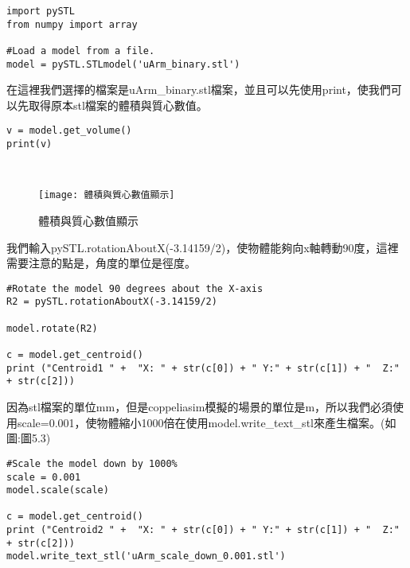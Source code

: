  \begin{lstlisting}[caption=\Large 輸入名稱]
import pySTL
from numpy import array

#Load a model from a file.
model = pySTL.STLmodel('uArm_binary.stl')

\end{lstlisting}

在這裡我們選擇的檔案是uArm\_binary.stl檔案，並且可以先使用print，使我們可以先取得原本stl檔案的體積與質心數值。 \\

 \begin{lstlisting}[caption=\Large 數值]
v = model.get_volume()
print(v)

\end{lstlisting}

\\
\begin{figure}[hbt!]
\begin{center}
\texttt{[image:  體積與質心數值顯示]}
\caption{\Large 體積與質心數值顯示}\label{ 體積與質心數值顯示}
\end{center}
\end{figure}

我們輸入pySTL.rotationAboutX(-3.14159/2)，使物體能夠向x軸轉動90度，這裡需要注意的點是，角度的單位是徑度。\\

 \begin{lstlisting}[caption=\Large 向X軸轉90度]
#Rotate the model 90 degrees about the X-axis
R2 = pySTL.rotationAboutX(-3.14159/2)

model.rotate(R2)

c = model.get_centroid()
print ("Centroid1 " +  "X: " + str(c[0]) + " Y:" + str(c[1]) + "  Z:" + str(c[2]))

\end{lstlisting}

因為stl檔案的單位mm，但是coppeliasim模擬的場景的單位是m，所以我們必須使用scale=0.001，使物體縮小1000倍在使用model.write\_text\_stl來產生檔案。(如圖:圖5.3)\\

 \begin{lstlisting}[caption=\Large 縮小1000倍]
#Scale the model down by 1000%
scale = 0.001
model.scale(scale)

c = model.get_centroid()
print ("Centroid2 " +  "X: " + str(c[0]) + " Y:" + str(c[1]) + "  Z:" + str(c[2]))
model.write_text_stl('uArm_scale_down_0.001.stl')

\end{lstlisting}

